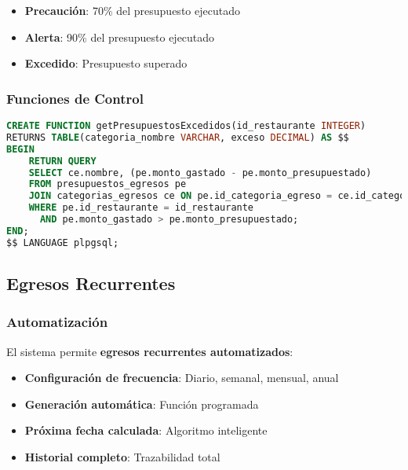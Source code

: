 \documentclass[12pt,a4paper]{article}
\newcommand{\highlight}[1]{\textcolor{primaryblue}{\textbf{#1}}}
\newcommand{\success}[1]{\textcolor{secondarygreen}{\textbf{#1}}}
\newcommand{\warning}[1]{\textcolor{warningorange}{\textbf{#1}}}
\newcommand{\danger}[1]{\textcolor{dangered}{\textbf{#1}}}
\begin{document}
\begin{itemize}[leftmargin=*]
    \item \warning{Precaución}: 70\% del presupuesto ejecutado
    \item \warning{Alerta}: 90\% del presupuesto ejecutado
    \item \danger{Excedido}: Presupuesto superado
\end{itemize}

\subsubsection{Funciones de Control}
\begin{lstlisting}[language=SQL, caption=Función para obtener presupuestos excedidos]
CREATE FUNCTION getPresupuestosExcedidos(id_restaurante INTEGER)
RETURNS TABLE(categoria_nombre VARCHAR, exceso DECIMAL) AS $$
BEGIN
    RETURN QUERY
    SELECT ce.nombre, (pe.monto_gastado - pe.monto_presupuestado)
    FROM presupuestos_egresos pe
    JOIN categorias_egresos ce ON pe.id_categoria_egreso = ce.id_categoria_egreso
    WHERE pe.id_restaurante = id_restaurante 
      AND pe.monto_gastado > pe.monto_presupuestado;
END;
$$ LANGUAGE plpgsql;
\end{lstlisting}

\subsection{Egresos Recurrentes}

\subsubsection{Automatización}
El sistema permite \highlight{egresos recurrentes automatizados}:

\begin{itemize}[leftmargin=*]
    \item \success{Configuración de frecuencia}: Diario, semanal, mensual, anual
    \item \success{Generación automática}: Función programada
    \item \success{Próxima fecha calculada}: Algoritmo inteligente
    \item \success{Historial completo}: Trazabilidad total
\end{itemize}
\end{document}
